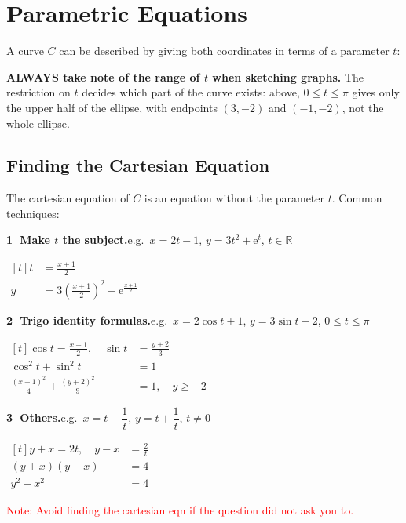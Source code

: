 \documentclass[a4paper,11pt,oneside]{book}
\providecommand{\e}{\mathrm{e}}
\providecommand{\cdisp}[1]{\par\noindent$\displaystyle\begin{aligned}[t]#1\end{aligned}$\par\smallskip}
\renewcommand{\cdisp}[1]{\par\noindent\hfill$\displaystyle\begin{aligned}[t]#1\end{aligned}$\hfill\null\par\smallskip}
\begin{document}
\section{Parametric Equations}
A curve $C$ can be described by giving both coordinates in terms of a parameter $t$:
{}
\begin{info}[title={CAUTION: sketching from parametric equations}]
\textbf{ALWAYS take note of the range of $t$ when sketching graphs.} The restriction on $t$ decides which part of the curve exists: above, $0\leqslant t\leqslant\pi$ gives only the upper half of the ellipse, with endpoints $(3,-2)$ and $(-1,-2)$, not the whole ellipse.
\end{info}
\subsection{Finding the Cartesian Equation}
The cartesian equation of $C$ is an equation without the parameter $t$. Common techniques:\par\smallskip
\textbf{\textcircled{\scriptsize1} Make $t$ the subject.}\quad e.g.\ $x=2t-1$, $y=3t^{2}+\e^{t}$, $t\in\mathbb{R}$
\cdisp{t&=\frac{x+1}{2}\\ y&=3\left(\frac{x+1}{2}\right)^{2}+\e^{\frac{x+1}{2}}}
\textbf{\textcircled{\scriptsize2} Trigo identity formulas.}\quad e.g.\ $x=2\cos t+1$, $y=3\sin t-2$, $0\leqslant t\leqslant\pi$
\cdisp{\cos t=\frac{x-1}{2},\quad \sin t&=\frac{y+2}{3}\\ \cos^{2}t+\sin^{2}t&=1\\ \frac{(x-1)^{2}}{4}+\frac{(y+2)^{2}}{9}&=1,\quad y\geqslant-2}
\textbf{\textcircled{\scriptsize3} Others.}\quad e.g.\ $x=t-\dfrac1t$, $y=t+\dfrac1t$, $t\neq0$
\cdisp{y+x=2t,\quad y-x&=\frac{2}{t}\\ (y+x)(y-x)&=4\\ y^{2}-x^{2}&=4}
\textcolor{red}{Note: Avoid finding the cartesian eqn if the question did not ask you to.}
\end{document}

